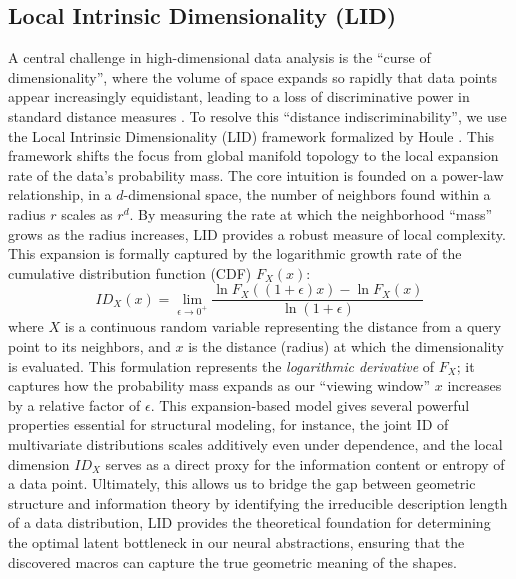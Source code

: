 \documentclass{thesis}
\begin{document}
\subsection{Local Intrinsic Dimensionality (LID)}
A central challenge in high-dimensional data analysis is the ``curse of dimensionality'', where the volume of space expands so rapidly that data points appear increasingly equidistant, leading to a loss of discriminative power in standard distance measures \cite{Beyer1999}. To resolve this ``distance indiscriminability'', we use the Local Intrinsic Dimensionality (LID) framework formalized by Houle \cite{IntrinsicDim}. This framework shifts the focus from global manifold topology to the local expansion rate of the data's probability mass. The core intuition is founded on a power-law relationship, in a $d$-dimensional space, the number of neighbors found within a radius $r$ scales as $r^d$. By measuring the rate at which the neighborhood ``mass'' grows as the radius increases, LID provides a robust measure of local complexity. This expansion is formally captured by the logarithmic growth rate of the cumulative distribution function (CDF) $F_{X}(x)$:
\begin{equation}\label{LIDDef}
    ID_{X}(x) = \lim_{\epsilon \to 0^{+}} \frac{\ln F_{X}((1+\epsilon)x) - \ln F_{X}(x)}{\ln(1+\epsilon)}
\end{equation}
where $X$ is a continuous random variable representing the distance from a query point to its neighbors, and $x$ is the distance (radius) at which the dimensionality is evaluated. This formulation represents the \textit{logarithmic derivative} of $F_X$; it captures how the probability mass expands as our ``viewing window'' $x$ increases by a relative factor of $\epsilon$. This expansion-based model gives several powerful properties essential for structural modeling, for instance, the joint ID of multivariate distributions scales additively even under dependence, and the local dimension $ID_X$ serves as a direct proxy for the information content or entropy of a data point. Ultimately, this allows us to bridge the gap between geometric structure and information theory by identifying the irreducible description length of a data distribution, LID provides the theoretical foundation for determining the optimal latent bottleneck in our neural abstractions, ensuring that the discovered macros can capture the true geometric meaning of the shapes. 

\end{document}
